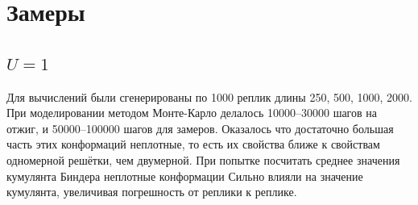 \section{Замеры}

\subsection{$U = 1$}
Для вычислений были сгенерированы по 1000 реплик длины 250, 500, 1000, 2000. При моделировании методом Монте-Карло делалось 10000--30000 шагов на отжиг, и 50000--100000 шагов для замеров. 
Оказалось что достаточно большая часть этих конформаций неплотные, то есть их свойства ближе к свойствам одномерной решётки, чем двумерной. При попытке посчитать среднее значения кумулянта Биндера неплотные конформации Сильно влияли на значение кумулянта, увеличивая погрешность от реплики к реплике.

